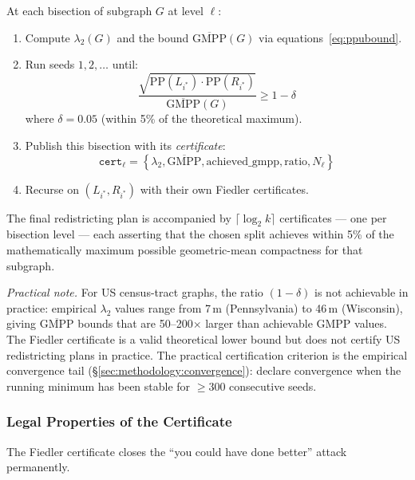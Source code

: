 \begin{definition}
\label{def:certified}
At each bisection of subgraph $G$ at level $\ell$:
\begin{enumerate}
  \item Compute $\lambda_2(G)$ and the bound $\overline{\mathrm{GMPP}}(G)$
        via equations~\eqref{eq:ppubound}.
  \item Run seeds $1, 2, \ldots$ until:
        \[
          \frac{\sqrt{\mathrm{PP}(L_{i^*}) \cdot \mathrm{PP}(R_{i^*})}}
               {\overline{\mathrm{GMPP}}(G)} \geq 1 - \delta
        \]
        where $\delta = 0.05$ (within 5\% of the theoretical maximum).
  \item Publish this bisection with its \emph{certificate}:
        \[
          \mathtt{cert}_\ell = \left\{
            \lambda_2, \overline{\mathrm{GMPP}},
            \text{achieved\_gmpp}, \text{ratio}, N_\ell
          \right\}
        \]
  \item Recurse on $(L_{i^*}, R_{i^*})$ with their own Fiedler certificates.
\end{enumerate}
\end{definition}

The final redistricting plan is accompanied by $\lceil\log_2 k\rceil$
certificates --- one per bisection level --- each asserting that the chosen
split achieves within 5\% of the mathematically maximum possible
geometric-mean compactness for that subgraph.

\emph{Practical note.} For US census-tract graphs, the ratio $(1-\delta)$ is
not achievable in practice: empirical $\lambda_2$ values range from 7\,m
(Pennsylvania) to 46\,m (Wisconsin), giving $\overline{\mathrm{GMPP}}$ bounds
that are 50--200$\times$ larger than achievable GMPP values. The Fiedler
certificate is a valid theoretical lower bound but does not certify US
redistricting plans in practice. The practical certification criterion is
the empirical convergence tail (\S\ref{sec:methodology:convergence}): declare
convergence when the running minimum has been stable for $\geq 300$ consecutive
seeds.

\subsubsection{Legal Properties of the Certificate}

The Fiedler certificate closes the ``you could have done better'' attack
permanently.

